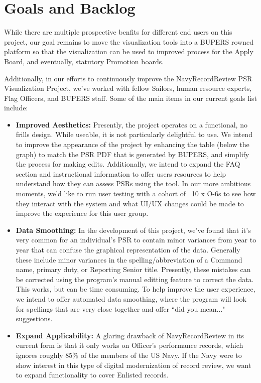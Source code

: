 \documentclass[UTF8]{article}
\begin{document}
\section{Goals and Backlog}
While there are multiple prospective benfits for different end users on this project, our goal remains to move the visualization tools into a BUPERS rowned platform so that the visualization can be used to improved process for the Apply Board, and eventually, statutory Promotion boards.

Additionally, in our efforts to continuously improve the NavyRecordReview PSR Visualization 
Project, we've worked with fellow Sailors, human resource experts, 
Flag Officers, and BUPERS staff. Some of the main items in our current goals 
list include:
\begin{itemize}
  \item \textbf{Improved Aesthetics:} Presently, the project operates on a 
  functional, no frills design. While useable, it is not particularly 
  delightful to use. We intend to improve the appearance of the project by 
  enhancing the table (below the graph) to match the PSR PDF that is generated
  by BUPERS, and simplify the process for making edits. Additionally, we intend
  to expand the FAQ section and instructional information to offer users
  resources to help understand how they can assess PSRs using the tool. In our
  more ambitious moments, we'd like to run user testing with a cohort of ~10 x 
  O-6s to see how they interact with the system and what UI/UX changes could be
  made to improve the experience for this user group.

  \item \textbf{Data Smoothing:} In the development of this project, we've found
  that it's very common for an individual's PSR to contain minor variances from
  year to year that can confuse the graphical representation of the data.
  Generally these include minor variances in the spelling/abbreviation of a 
  Command name, primary duty, or Reporting Senior title. Presently, these 
  mistakes can be corrected using the program's manual editting feature to
  correct the data. This works, but can be time consuming. To help improve the 
  user experience, we intend to offer automated data smoothing, where the 
  program will look for spellings that are very close together and offer 
  ``did you mean..." suggestions.

  \item \textbf{Expand Applicability:} A glaring drawback of NavyRecordReview in
  its current form is that it only works on Officer's performance records, which
  ignores roughly 85\% of the members of the US Navy. If the Navy were to show 
  interest in this type of digital modernization of record review, we want to 
  expand functionality to cover Enlisted records.


\end{itemize}
\end{document}
